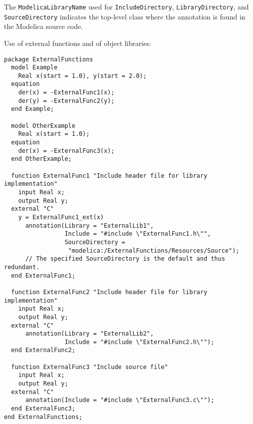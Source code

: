 The {\lstinline!ModelicaLibraryName!} used for {\lstinline!IncludeDirectory!}, {\lstinline!LibraryDirectory!}, and {\lstinline!SourceDirectory!} indicates the top-level class where the annotation is found in the Modelica source code.

\begin{example}
Use of external functions and of object libraries:
\begin{lstlisting}[language=modelica]
package ExternalFunctions
  model Example
    Real x(start = 1.0), y(start = 2.0);
  equation
    der(x) = -ExternalFunc1(x);
    der(y) = -ExternalFunc2(y);
  end Example;

  model OtherExample
    Real x(start = 1.0);
  equation
    der(x) = -ExternalFunc3(x);
  end OtherExample;

  function ExternalFunc1 "Include header file for library implementation"
    input Real x;
    output Real y;
  external "C"
    y = ExternalFunc1_ext(x)
      annotation(Library = "ExternalLib1",
                 Include = "#include \"ExternalFunc1.h\"",
                 SourceDirectory =
                  "modelica:/ExternalFunctions/Resources/Source");
      // The specified SourceDirectory is the default and thus redundant.
  end ExternalFunc1;

  function ExternalFunc2 "Include header file for library implementation"
    input Real x;
    output Real y;
  external "C"
      annotation(Library = "ExternalLib2",
                 Include = "#include \"ExternalFunc2.h\"");
  end ExternalFunc2;

  function ExternalFunc3 "Include source file"
    input Real x;
    output Real y;
  external "C"
      annotation(Include = "#include \"ExternalFunc3.c\"");
  end ExternalFunc3;
end ExternalFunctions;


\end{lstlisting}
\end{example}
